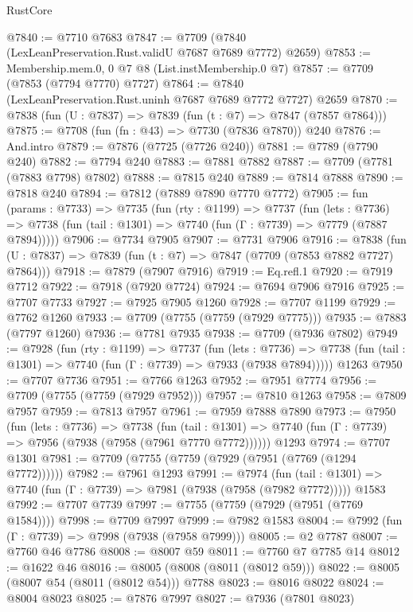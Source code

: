 \begin{lexlean}{RustCore}
\begin{coremodule}
@7840 := @7710 @7683
@7847 := @7709 (@7840 (LexLeanPreservation.Rust.validU @7687 @7689 @7772) @2659)
@7853 := Membership.mem.{0, 0} @7 @8 (List.instMembership.{0} @7)
@7857 := @7709 (@7853 (@7794 @7770) @7727)
@7864 := @7840 (LexLeanPreservation.Rust.uninh @7687 @7689 @7772 @7727) @2659
@7870 := @7838 (fun (U : @7837) => @7839 (fun (t : @7) => @7847 (@7857 @7864)))
@7875 := @7708 (fun (fn : @43) => @7730 (@7836 @7870)) @240
@7876 := And.intro
@7879 := @7876 (@7725 (@7726 @240))
@7881 := @7789 (@7790 @240)
@7882 := @7794 @240
@7883 := @7881 @7882
@7887 := @7709 (@7781 (@7883 @7798) @7802)
@7888 := @7815 @240
@7889 := @7814 @7888
@7890 := @7818 @240
@7894 := @7812 (@7889 @7890 @7770 @7772)
@7905 := fun (params : @7733) =>
  @7735
    (fun (rty : @1199) =>
    @7737
      (fun (lets : @7736) =>
      @7738 (fun (tail : @1301) => @7740 (fun (Γ : @7739) => @7779 (@7887 @7894)))))
@7906 := @7734 @7905
@7907 := @7731 @7906
@7916 := @7838 (fun (U : @7837) => @7839 (fun (t : @7) => @7847 (@7709 (@7853 @7882 @7727) @7864)))
@7918 := @7879 (@7907 @7916)
@7919 := Eq.refl.{1}
@7920 := @7919 @7712
@7922 := @7918 (@7920 @7724)
@7924 := @7694 @7906 @7916
@7925 := @7707 @7733
@7927 := @7925 @7905 @1260
@7928 := @7707 @1199
@7929 := @7762 @1260
@7933 := @7709 (@7755 (@7759 (@7929 @7775)))
@7935 := @7883 (@7797 @1260)
@7936 := @7781 @7935
@7938 := @7709 (@7936 @7802)
@7949 := @7928
    (fun (rty : @1199) =>
    @7737
      (fun (lets : @7736) =>
      @7738 (fun (tail : @1301) => @7740 (fun (Γ : @7739) => @7933 (@7938 @7894)))))
    @1263
@7950 := @7707 @7736
@7951 := @7766 @1263
@7952 := @7951 @7774
@7956 := @7709 (@7755 (@7759 (@7929 @7952)))
@7957 := @7810 @1263
@7958 := @7809 @7957
@7959 := @7813 @7957
@7961 := @7959 @7888 @7890
@7973 := @7950
    (fun (lets : @7736) =>
    @7738
      (fun (tail : @1301) => @7740 (fun (Γ : @7739) => @7956 (@7938 (@7958 (@7961 @7770 @7772))))))
    @1293
@7974 := @7707 @1301
@7981 := @7709 (@7755 (@7759 (@7929 (@7951 (@7769 (@1294 @7772))))))
@7982 := @7961 @1293
@7991 := @7974
    (fun (tail : @1301) => @7740 (fun (Γ : @7739) => @7981 (@7938 (@7958 (@7982 @7772)))))
    @1583
@7992 := @7707 @7739
@7997 := @7755 (@7759 (@7929 (@7951 (@7769 @1584))))
@7998 := @7709 @7997
@7999 := @7982 @1583
@8004 := @7992 (fun (Γ : @7739) => @7998 (@7938 (@7958 @7999)))
@8005 := @2 @7787
@8007 := @7760 @46 @7786
@8008 := @8007 @59
@8011 := @7760 @7 @7785 @14
@8012 := @1622 @46
@8016 := @8005 (@8008 (@8011 (@8012 @59)))
@8022 := @8005 (@8007 @54 (@8011 (@8012 @54))) @7788
@8023 := @8016 @8022
@8024 := @8004 @8023
@8025 := @7876 @7997
@8027 := @7936 (@7801 @8023)

\end{coremodule}
\end{lexlean}
